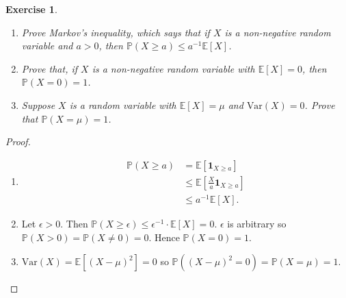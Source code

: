 \documentclass{article}
\newtheorem{exercise}[theorem]{Exercise}
\begin{document}
\begin{exercise}
\begin{enumerate}
    \item[(a)] Prove Markov's inequality, which says that if $X$  is a non-negative random variable and $a>0$, then $\mathbb{P}(X\geq a)\leq a^{-1}\mathbb{E}[X]$.
    \item[(b)] Prove that, if $X$ is a non-negative random variable with $\mathbb{E}[X]=0$, then $\mathbb{P}(X=0)=1$.
    \item[(c)] Suppose $X$ is a random variable with $\mathbb{E}[X]=\mu$ and $\text{Var}(X)=0$. Prove that $\mathbb{P}(X=\mu)=1$.
\end{enumerate}
\end{exercise}
\begin{proof}
\begin{enumerate}
    \item[(a)] \begin{align*}
        \mathbb{P}(X\geq a)&=\mathbb{E}[\mathbf{1}_{X\geq a}]\\&\leq\mathbb{E}\left[\frac{X}{a}\mathbf{1}_{X\geq a}\right]\\&\leq a^{-1}\mathbb{E}[X].
    \end{align*}
    \item[(b)] Let $\epsilon > 0$. Then $\mathbb{P}(X\geq\epsilon)\leq\epsilon^{-1}\cdot\mathbb{E}[X]=0$. $\epsilon$ is arbitrary so $\mathbb{P}(X>0)=\mathbb{P}(X\neq 0)=0$. Hence $\mathbb{P}(X=0)=1$.
    \item[(c)] $\text{Var}(X)=\mathbb{E}[(X-\mu)^2]=0$ so $\mathbb{P}((X-\mu)^2=0)=\mathbb{P}(X=\mu)=1$.
\end{enumerate}
\end{proof}
\end{document}
